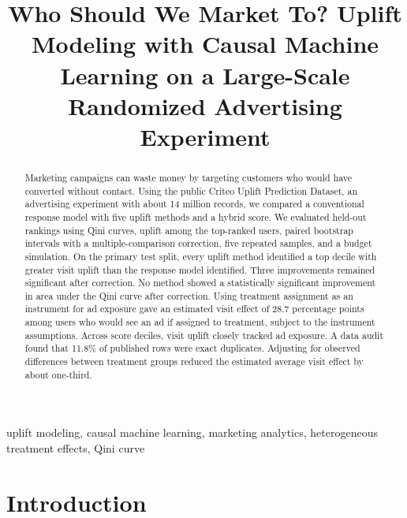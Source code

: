 \documentclass[conference]{IEEEtran}
\begin{document}
\title{Who Should We Market To? Uplift Modeling with Causal Machine Learning
on a Large-Scale Randomized Advertising Experiment}

\author{
}

\maketitle

\begin{abstract}
Marketing campaigns can waste money by targeting customers who would have
converted without contact. Using the public Criteo Uplift Prediction Dataset,
an advertising experiment with about 14 million records, we compared a
conventional response model with five uplift methods and a hybrid score.
We evaluated held-out rankings using Qini curves, uplift among the
top-ranked users, paired bootstrap intervals with a multiple-comparison
correction, five repeated samples, and a budget simulation.
On the primary test split, every uplift method identified a top decile with
greater visit uplift than the response model identified. Three improvements
remained significant after correction. No method showed a statistically
significant improvement in area under the Qini curve after correction.
Using treatment assignment as an instrument for ad exposure gave an
estimated visit effect of 28.7 percentage points among users who would
see an ad if assigned to treatment, subject to the instrument assumptions.
Across score deciles, visit uplift closely tracked ad exposure.
A data audit found that 11.8\% of published rows were exact duplicates.
Adjusting for observed differences between treatment groups reduced the
estimated average visit effect by about one-third.
\end{abstract}

\begin{IEEEkeywords}
uplift modeling, causal machine learning, marketing analytics,
heterogeneous treatment effects, Qini curve
\end{IEEEkeywords}

\section{Introduction}
\end{document}
